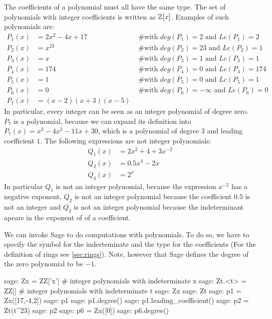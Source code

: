 \begin{example}
\label{example:integer_polynomials} The coefficients of a polynomial must all have the same type. The set of polynomials with integer coefficients is written as $\mathbb{Z}[x]$. Examples of such polynomials are:
\begin{align*}
P_1(x) &= 2x^2 -4x +17 & \text{ \# with } deg(P_1)=2 \text{ and } Lc(P_1)=2\\
P_2(x) &= x^{23} & \text{ \# with } deg(P_2)=23 \text{ and } Lc(P_2)=1\\
P_3(x) &= x & \text{ \# with }  deg(P_3)=1 \text{ and } Lc(P_3)=1\\
P_4(x) &= 174 & \text{ \# with }  deg(P_4)=0 \text{ and } Lc(P_4)=174\\
P_5(x) &= 1 & \text{ \# with }  deg(P_5)=0 \text{ and } Lc(P_5)=1\\
P_6(x) &= 0 & \text{ \# with }  deg(P_6)=-\infty \text{ and } Lc(P_6)=0\\
P_7(x) &= (x-2)(x+3)(x-5)
\end{align*}
In particular, every integer can be seen as an integer polynomial of degree zero. $P_7$ is a polynomial, because we can expand its definition into $P_7(x)=x^3 - 4 x^2 - 11 x + 30$, which is a polynomial of degree $3$ and leading coefficient $1$. The following expressions are not integer polynomials:
\begin{align*}
Q_1(x) &= 2x^2 + 4 + 3x^{-2}\\
Q_2(x) &= 0.5x^4 -2x\\
Q_3(x) &=2^x
\end{align*}
In particular $Q_1$ is not an integer polynomial, because the expression $x^{-2}$ has a negative exponent, $Q_2$ is not an integer polynomial because the coefficient $0.5$ is not an integer and $Q_3$ is not an integer polynomial because the indeterminant apears in the exponent of of a coefficient.

We can invoke Sage to do computations with polynomials. To do so, we have to specify the symbol for the inderteminate and the type for the coefficients (For the definition of rings see \ref{sec:rings}). Note, however that Sage defines the degree of the zero polynomial to be $-1$.
\begin{sagecommandline}
sage: Zx = ZZ['x'] # integer polynomials with indeterminate x
sage: Zt.<t> = ZZ[] # integer polynomials with indeterminate t
sage: Zx
sage: Zt
sage: p1 = Zx([17,-4,2])
sage: p1
sage: p1.degree()
sage: p1.leading_coefficient()
sage: p2 = Zt(t^23)
sage: p2
sage: p6 = Zx([0])
sage: p6.degree()
\end{sagecommandline}
\end{example}
